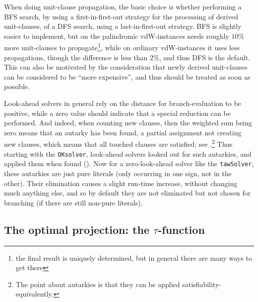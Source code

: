 \documentclass[final,3p,times]{elsarticle}
\theoremstyle{definition}
\newcommand{\tawsolver}{\texttt{tawSolver}}
\newcommand{\oksolver}{\texttt{OKsolver}}
\begin{document}
When doing unit-clause propagation, the basic choice is whether performing a BFS search, by using a first-in-first-out strategy for the processing of derived unit-clauses, of a DFS search, using a last-in-first-out strategy. BFS is slightly easier to implement, but on the palindromic vdW-instances needs roughly $10\%$ more unit-clauses to propagate\footnote{the final result is uniquely determined, but in general there are many ways to get there}, while on ordinary vdW-instances it uses less propagations, though the difference is less than $2\%$, and thus DFS is the default. This can also be motivated by the consideration that newly derived unit-clauses can be considered to be ``more expensive'', and thus should be treated as soon as possible.

Look-ahead solvers in general rely on the distance for branch-evaluation to be positive, while a zero value should indicate that a special reduction can be performed. And indeed, when counting new clauses, then the weighted sum being zero means that an autarky has been found, a partial assignment not creating new clauses, which means that all touched clauses are satisfied; see \cite{Kullmann2007HandbuchMU}.\footnote{The point about autarkies is that they can be applied satisfiability-equivalently.} Thus starting with the \oksolver{}, look-ahead solvers looked out for such autarkies, and applied them when found (\cite{HvM09HBSAT,Kullmann2007HandbuchTau}). Now for a zero-look-ahead solver like the \tawsolver, these autarkies are just pure literals (only occurring in one sign, not in the other). Their elimination causes a slight run-time increase, without changing much anything else, and so by default they are not eliminated but not chosen for branching (if there are still non-pure literals).


\subsection{The optimal projection: the $\tau$-function}
\label{sec:tauproj}
\end{document}

